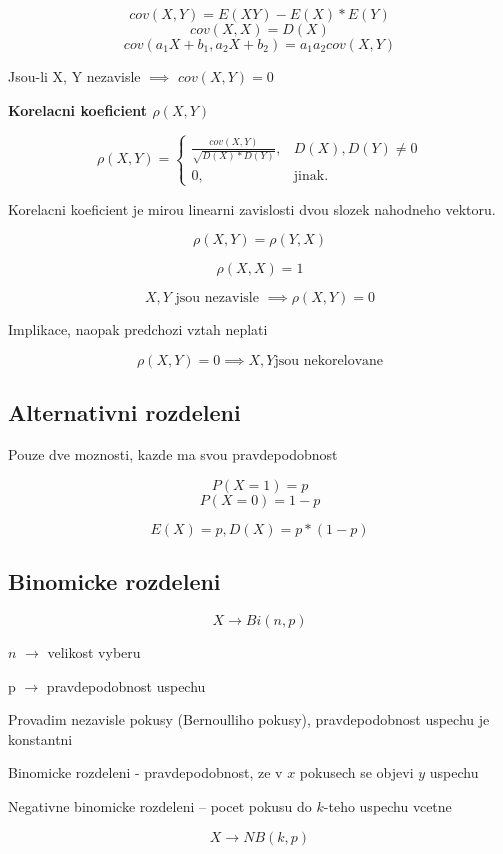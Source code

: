 \documentclass{article}
\begin{document}
\[ cov(X, Y) = E(XY) - E(X)*E(Y) \]
\[ cov(X,X) = D(X) \]
\[ cov(a_1X + b_1, a_2X + b_2) = a_1a_2cov(X,Y) \]

Jsou-li X, Y nezavisle $\implies$ $cov(X,Y) = 0$

\textbf{Korelacni koeficient $\rho(X, Y)$}

\begin{equation}
    \rho(X,Y)=\begin{cases}
    \frac { cov(X,Y) } { \sqrt{D(X) * D(Y)} }, & D(X), D(Y) \neq 0\\
    0, & \text{jinak}.
  \end{cases}
\end{equation}

Korelacni koeficient je mirou linearni zavislosti dvou slozek nahodneho vektoru.

\[ \rho(X, Y) = \rho(Y, X) \]

\[ \rho(X, X) = 1 \]

\[ X, Y \text{ jsou nezavisle } \implies \rho(X, Y) = 0 \]

Implikace, naopak predchozi vztah neplati

\[ \rho(X, Y) = 0 \implies X, Y \text{jsou nekorelovane} \]

\subsection{Alternativni rozdeleni}

Pouze dve moznosti, kazde ma svou pravdepodobnost

\[ P(X=1) = p \]
\[ P(X=0) = 1-p \]

\[ E(X) = p, D(X) = p * (1 - p) \]

\subsection{Binomicke rozdeleni}

\[ X \rightarrow Bi(n, p) \]

$n$ $\rightarrow$ velikost vyberu

p $\rightarrow$ pravdepodobnost uspechu

Provadim nezavisle pokusy (Bernoulliho pokusy), pravdepodobnost uspechu je konstantni

Binomicke rozdeleni - pravdepodobnost, ze v $x$ pokusech se objevi $y$ uspechu

Negativne binomicke rozdeleni -- pocet pokusu do $k$-teho uspechu vcetne

\[ X \rightarrow NB(k, p) \]
\end{document}
